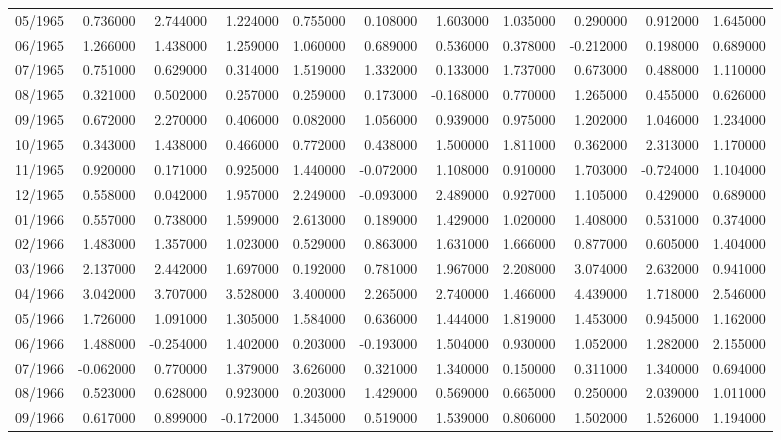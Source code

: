 \begin{tabular}{lrrrrrrrrrr}
05/1965 & 0.736000 & 2.744000 & 1.224000 & 0.755000 & 0.108000 & 1.603000 & 1.035000 & 0.290000 & 0.912000 & 1.645000 \\
06/1965 & 1.266000 & 1.438000 & 1.259000 & 1.060000 & 0.689000 & 0.536000 & 0.378000 & -0.212000 & 0.198000 & 0.689000 \\
07/1965 & 0.751000 & 0.629000 & 0.314000 & 1.519000 & 1.332000 & 0.133000 & 1.737000 & 0.673000 & 0.488000 & 1.110000 \\
08/1965 & 0.321000 & 0.502000 & 0.257000 & 0.259000 & 0.173000 & -0.168000 & 0.770000 & 1.265000 & 0.455000 & 0.626000 \\
09/1965 & 0.672000 & 2.270000 & 0.406000 & 0.082000 & 1.056000 & 0.939000 & 0.975000 & 1.202000 & 1.046000 & 1.234000 \\
10/1965 & 0.343000 & 1.438000 & 0.466000 & 0.772000 & 0.438000 & 1.500000 & 1.811000 & 0.362000 & 2.313000 & 1.170000 \\
11/1965 & 0.920000 & 0.171000 & 0.925000 & 1.440000 & -0.072000 & 1.108000 & 0.910000 & 1.703000 & -0.724000 & 1.104000 \\
12/1965 & 0.558000 & 0.042000 & 1.957000 & 2.249000 & -0.093000 & 2.489000 & 0.927000 & 1.105000 & 0.429000 & 0.689000 \\
01/1966 & 0.557000 & 0.738000 & 1.599000 & 2.613000 & 0.189000 & 1.429000 & 1.020000 & 1.408000 & 0.531000 & 0.374000 \\
02/1966 & 1.483000 & 1.357000 & 1.023000 & 0.529000 & 0.863000 & 1.631000 & 1.666000 & 0.877000 & 0.605000 & 1.404000 \\
03/1966 & 2.137000 & 2.442000 & 1.697000 & 0.192000 & 0.781000 & 1.967000 & 2.208000 & 3.074000 & 2.632000 & 0.941000 \\
04/1966 & 3.042000 & 3.707000 & 3.528000 & 3.400000 & 2.265000 & 2.740000 & 1.466000 & 4.439000 & 1.718000 & 2.546000 \\
05/1966 & 1.726000 & 1.091000 & 1.305000 & 1.584000 & 0.636000 & 1.444000 & 1.819000 & 1.453000 & 0.945000 & 1.162000 \\
06/1966 & 1.488000 & -0.254000 & 1.402000 & 0.203000 & -0.193000 & 1.504000 & 0.930000 & 1.052000 & 1.282000 & 2.155000 \\
07/1966 & -0.062000 & 0.770000 & 1.379000 & 3.626000 & 0.321000 & 1.340000 & 0.150000 & 0.311000 & 1.340000 & 0.694000 \\
08/1966 & 0.523000 & 0.628000 & 0.923000 & 0.203000 & 1.429000 & 0.569000 & 0.665000 & 0.250000 & 2.039000 & 1.011000 \\
09/1966 & 0.617000 & 0.899000 & -0.172000 & 1.345000 & 0.519000 & 1.539000 & 0.806000 & 1.502000 & 1.526000 & 1.194000 \\

\end{tabular}
